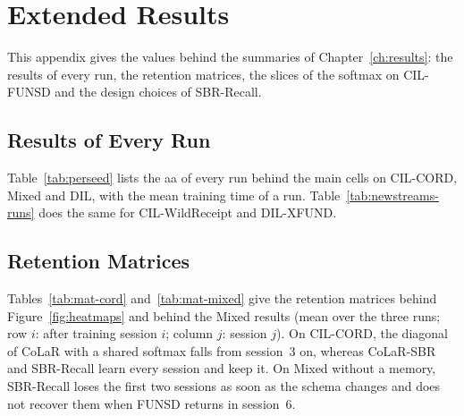 \chapter{Extended Results}
\label{app:extended-results}

This appendix gives the values behind the summaries of Chapter~\ref{ch:results}: the
results of every run, the retention matrices, the slices of the softmax on CIL-FUNSD and
the design choices of SBR-Recall.

\section{Results of Every Run}
\label{app:per-run}

Table~\ref{tab:perseed} lists the \gls{aa} of every run behind the main cells on CIL-CORD,
Mixed and DIL, with the mean training time of a run. Table~\ref{tab:newstreams-runs} does
the same for CIL-WildReceipt and DIL-XFUND.

\begin{table}[!htbp]
  \centering
  \caption[AA of every run on CIL-CORD, Mixed and DIL]{\textbf{AA of every run} on
  CIL-CORD, Mixed and DIL (columns: the three runs; h/run: mean training time in hours).
  Source: \emph{clean} is the protocol of Section~\ref{sec:e-protocol}; the rows marked
  $^{\dagger}$ follow an earlier protocol and belong to Appendix~\ref{app:earlier}.}
  \label{tab:perseed}
  \footnotesize
\end{table}

\begin{table}[!htbp]
  \centering
  \caption[Results of every run on CIL-WildReceipt and DIL-XFUND]{\textbf{Results of every
  run} on CIL-WildReceipt and DIL-XFUND.}
  \label{tab:newstreams-runs}
  \footnotesize
\end{table}

\section{Retention Matrices}
\label{app:matrices}

Tables~\ref{tab:mat-cord} and~\ref{tab:mat-mixed} give the retention matrices behind
Figure~\ref{fig:heatmaps} and behind the Mixed results (mean over the three runs; row $i$:
after training session $i$; column $j$: session $j$). On CIL-CORD, the diagonal of CoLaR
with a shared softmax falls from session~3 on, whereas CoLaR-SBR and SBR-Recall learn
every session and keep it. On Mixed without a memory, SBR-Recall loses the first two
sessions as soon as the schema changes and does not recover them when FUNSD returns in
session~6.

